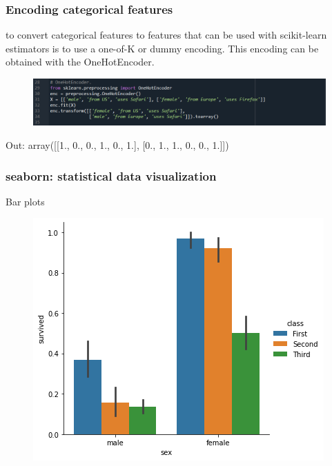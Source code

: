 \documentclass{beamer}
\begin{document}

\begin{frame}[fragile] %
\frametitle{Encoding categorical features}

\begin{example} [OneHotEncoder]
to convert categorical features to features that can be used with scikit-learn estimators is to use a one-of-K or dummy encoding. This  encoding can be obtained with the OneHotEncoder.

\end{example}

\begin{figure}
\includegraphics[width=0.8\linewidth]{Seminar_3_images/Python/02.png}
\end{figure}
Out: 
array([[1., 0., 0., 1., 0., 1.],
       [0., 1., 1., 0., 0., 1.]])

\end{frame}
\begin{frame}[fragile] %
\frametitle{seaborn: statistical data visualization}


\begin{example} 
Bar plots

\end{example}

\begin{figure}
\includegraphics[width=0.6\linewidth]{Seminar_3_images/Python/03.png}
\end{figure}

\end{frame}
\end{document}
